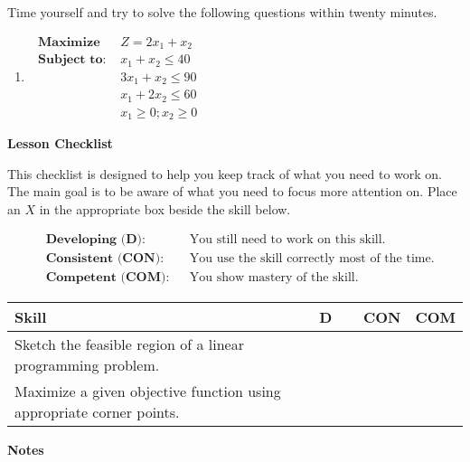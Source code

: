 \documentclass[10pt]{book}
\theoremstyle{definition}
\theoremstyle{remark}
\begin{document}
\begin{large}
\noindent
Time yourself and try to solve the following questions within twenty minutes. 
\begin{enumerate}
\item $\begin{array}{ll} 
\textbf { Maximize } & Z=2x_{1}+x_{2} \\ 
\textbf { Subject to: } &  x_{1}+x_{2} \leq 40 \\ 
&  3x_{1}+x_{2} \leq 90\\ 
&  x_{1}+2x_{2} \leq 60\\ 
& x_{1} \geq 0 ; x_{2} \geq 0 
\end{array}\nonumber$
\end{enumerate}

\noindent
\textbf{Lesson Checklist}
\bigskip

\noindent
This checklist is designed to help you keep track of what you need to work on. The main goal is to be aware of what you need to focus more attention on. Place an $X$ in the appropriate box beside the skill below. 
\bigskip

\noindent
\begin{align*}
&\textbf{Developing (D):} &&\textrm{You still need to work on this skill.}\\
&\textbf{Consistent (CON):} &&\textrm{You use the skill correctly most of the time.}\\
&\textbf{Competent (COM):} &&\textrm{You show mastery of the skill.} 
\end{align*}
\vfil

\begin{center}
\begin{tabular}{|l|l|l|l|}
\hline
\textbf{Skill} & \textbf{~~D~~} & \textbf{CON} & \textbf{COM} \\
\hline
Sketch the feasible region of a linear programming problem.&&&\\
\hline
Maximize a given objective function using appropriate corner points.&&&\\
\hline
\end{tabular}
\end{center}
\vfil

\noindent
\textbf{Notes}
\end{large} \vfil
\newpage

\end{document}
